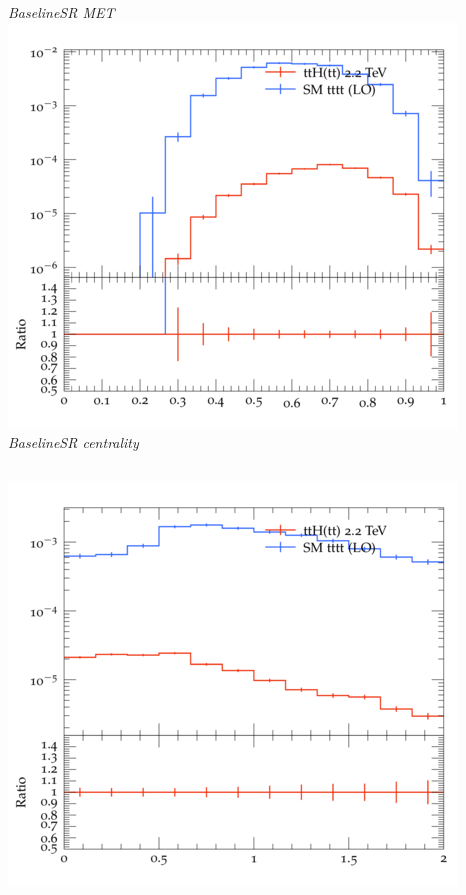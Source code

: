 \documentclass{beamer}
\begin{document}
\begin{frame}
\begin{columns}
\textit{\small BaselineSR MET}
\includegraphics[width=\textwidth]{../plots/ttH_2200/tttt_ttH_1LOS/BaselineSR_centrality.png}\\
\textit{\small BaselineSR centrality}
\end{columns}
\begin{columns}
\includegraphics[width=\textwidth]{../plots/ttH_2200/tttt_ttH_1LOS/BaselineSR_deltaR_bl_min.png}\\

\end{columns}
\end{frame}
\end{document}
